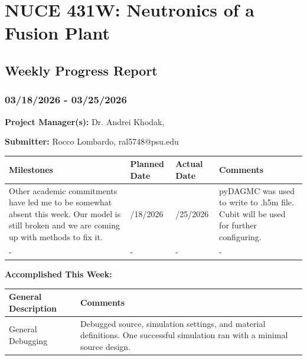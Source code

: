 \documentclass{article}
\begin{document}
{\centering \section*{NUCE 431W: Neutronics of a Fusion Plant}

\subsection*{Weekly Progress Report}

\subsubsection*{03/18/2026 - 03/25/2026}}


\hrulefill

\bigskip

\textbf{Project Manager(s):} Dr. Andrei Khodak,  

\bigskip

\textbf{Submitter:} Rocco Lombardo, ral5748@psu.edu

\bigskip

\renewcommand{\arraystretch}{1.5}
\begin{table}[H]
    \centering
    \begin{tabularx}{0.95\textwidth} { 
        | >{\centering\arraybackslash}X 
        | >{\centering\arraybackslash}X 
        | >{\centering\arraybackslash}X
        | >{\centering\arraybackslash}X | }

    \hline
    \textbf{Milestones} & \textbf{Planned Date} & \textbf{Actual Date} & \textbf{Comments} \\
    \hline
    Other academic commitments have led me to be somewhat absent this week. Our model is still broken and we are coming up with methods to fix it.  & 03/18/2026 & 03/25/2026 & pyDAGMC was used to write to .h5m file. Cubit will be used for further configuring.  \\
    \hline
    - & - & - & - \\
    \hline
    \end{tabularx}
\end{table}

\bigskip

\textbf{Accomplished This Week: }

\renewcommand{\arraystretch}{1.5}
\begin{table}[H]
    \centering
    \begin{tabularx}{0.95\textwidth} { 
        | >{\centering\arraybackslash}X
        | >{\centering\arraybackslash}X | }

    \hline
    \textbf{General Description} & \textbf{Comments} \\
    \hline
    General Debugging  & Debugged source, simulation settings, and material definitions. One successful simulation ran with a minimal source design. \\
    \hline
    \end{tabularx}
\end{table}
\end{document}
